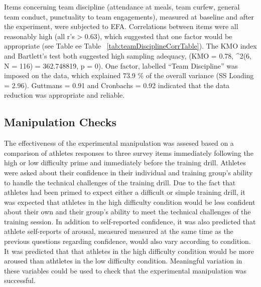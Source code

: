 \documentclass[english]{article}\usepackage[]{graphicx}\usepackage[]{color}
\newcommand{\myparagraph}[1]{\paragraph{#1}\mbox{}\\}
\begin{document}
Items concerning team discipline (attendance at meals, team curfew, general team conduct, punctuality to team engagements), measured at baseline and after the experiment, were subjected to EFA.  Correlations between items were all reasonably high (all r's > 0.63), which suggested that one factor would be appropriate (see Table ee Table ~\ref{tab:teamDisciplineCorrTable}). 
The KMO index and Bartlett's test both suggested high sampling adequacy, (KMO =  0.78, \chi^2(6, N = 116) = 362.748819, p = 0).  
One factor, labelled ``Team Discipline'' was imposed on the data, which explained 73.9 \% of the overall variance (SS Loading = 2.96).  Guttmans \lambda = 0.91  and  Cronbachs \alpha = 0.92  indicated that the data reduction was appropriate and reliable.








\subsection{Manipulation Checks}
The effectiveness of the experimental manipulation was assesed based on a comparison of athletes responses to three survey items immediately following the high or low difficulty prime and immediately before the training drill.  Athletes were asked about their confidence in their individual and training group's ability to handle the technical challenges of the training drill.  Due to the fact that athletes had been primed to expect either a difficult or simple training drill, it was expected that athletes in the high difficulty condition would be less confident about their own and their group's ability to meet the technical challenges of the training session. In addition to self-reported confidence, it was also predicted that athlete self-reports of arousal, measured measured at the same time as the previous questions regarding confidence, would also vary according to condition.  It was predicted that that athletes in the high difficulty condition would be more aroused than athtletes in the low difficulty condition.  Meaningful variation in these variables could be used to check that the experimental manipulation was successful.
\end{document}
